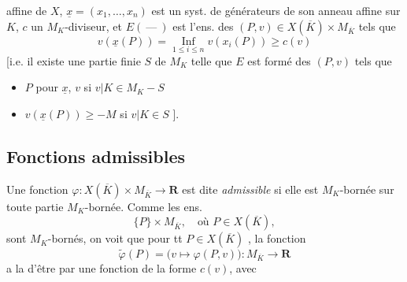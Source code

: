 \documentclass[11pt,a4paper]{article}
\begin{document}
affine de $X$, $\underline{x} = (x_1, \ldots, x_n)$ est un syst. de
générateurs de son anneau affine sur $K$, $c$ un $M_K$-diviseur, et
$E(\ \text{---}\ )$ est l'ens. des
$(P, v) \in X(\overline{K}) \times M_{\overline{K}}$ tels que
\[
  v(\underline{x}(P)) = \operatorname*{Inf}_{1 \leqslant i \leqslant n}
  v(x_i(P)) \geqslant c(v)
\]
[i.e.  il existe une partie finie $S$ de $M_K$ telle
que $E$ est formé des $(P, v)$ 
tels que
\begin{itemize}
  \item[a)] $P$  pour $\underline{x}$, $v$ si
  $v|K \in M_K - S$
  \item[b)] $v(\underline{x}(P)) \geqslant -M$ si $v|K \in S$ ].
\end{itemize}


\subsection{Fonctions admissibles}

Une fonction $\varphi : X(\overline{K}) \times M_{\overline{K}} \to \mathbf{R}$
est dite \emph{admissible} si elle est \struck{\ill{}} $M_K$-bornée sur toute
partie $M_K$-bornée. Comme les ens.
\[
  \{P\} \times M_{\overline{K}} , \quad \text{où } P \in X(\overline{K}) ,
\]
sont $M_K$-bornés, on voit que  pour tt
$P \in X(\overline{K})$ , la fonction
\[
  \widetilde{\varphi}(P) = \bigl(v \mapsto \varphi(P, v)\bigr) :
  M_{\overline{K}} \to \mathbf{R}
\]
a la  d'être \struck{\ill{}} 
 par une fonction de la forme $c(v)$, avec
\end{document}
